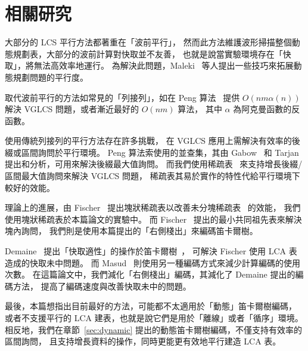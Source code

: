\section{相關研究} \label{sec:RelatedWork}

大部分的 LCS 平行方法都著重在「波前平行」，
然而此方法維護波形掃描整個動態規劃表，大部分的波前計算對快取並不友善，
也就是說當實驗環境存在「快取」，將無法高效率地運行。
為解決此問題，Maleki~\cite{Maleki2016EfficientPU} 
等人提出一些技巧來拓展動態規劃問題的平行度。

取代波前平行的方法如常見的「列接列」，如在 Peng 算法~\cite{Peng2011TheLC} 
提供 $O(nm \alpha(n))$ 解決 VGLCS 問題，或者漸近最好的 $O(nm)$ 算法，
其中 $\alpha$ 為阿克曼函數的反函數。

使用傳統列接列的平行方法存在許多挑戰，
在 VGLCS 應用上需解決有效率的後綴或區間詢問於平行環境。
Peng 算法索使用的並查集，其由 Gabow~\cite{Gabow1983ALA} 和 
Tarjan~\cite{Tarjan1975EfficiencyOA} 提出和分析，可用來解決後綴最大值詢問。
而我們使用稀疏表~\cite{Berkman1993RecursiveSP} 來支持增長後綴/區間最大值詢問來解決 VGLCS 問題，
稀疏表其易於實作的特性代給平行環境下較好的效能。

理論上的進展，由 Fischer~\cite{Fischer2006TheoreticalAP} 
提出塊狀稀疏表以改善未分塊稀疏表~\cite{Berkman1993RecursiveSP} 的效能，
我們使用塊狀稀疏表於本篇論文的實驗中。
而 Fischer~\cite{Fischer2006TheoreticalAP} 提出的最小共同祖先表來解決塊內詢問，
我們則是使用本篇提出的「右側棧出」來編碼笛卡爾樹。

Demaine~\cite{Demaine2009OnCT} 提出「快取適性」的操作於笛卡爾樹~\cite{Vuillemin1980AUL}，
可解決 Fischer 使用 LCA 表造成的快取未中問題。
而 Masud~\cite{Hasan2010CacheOA} 則使用另一種編碼方式來減少計算編碼的使用次數。
在這篇論文中，我們減化「右側棧出」編碼，其減化了 Demaine 提出的編碼方法，
提高了編碼速度與改善快取未中的問題。

最後，本篇想指出目前最好的方法，可能都不太適用於「動態」笛卡爾樹編碼，
或者不支援平行的 LCA 建表，也就是說它們是用於「離線」或者「循序」環境。
相反地，我們在章節~\ref{sec:dynamic} 提出的動態笛卡爾樹編碼，不僅支持有效率的區間詢問，
且支持增長資料的操作，同時更能更有效地平行建造 LCA 表。
